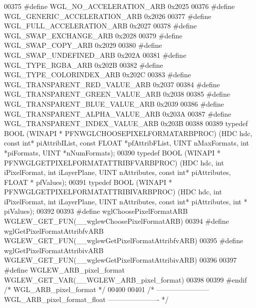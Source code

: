 \begin{DoxyCode}
00375 \textcolor{preprocessor}{#define WGL\_NO\_ACCELERATION\_ARB 0x2025}
00376 \textcolor{preprocessor}{#define WGL\_GENERIC\_ACCELERATION\_ARB 0x2026}
00377 \textcolor{preprocessor}{#define WGL\_FULL\_ACCELERATION\_ARB 0x2027}
00378 \textcolor{preprocessor}{#define WGL\_SWAP\_EXCHANGE\_ARB 0x2028}
00379 \textcolor{preprocessor}{#define WGL\_SWAP\_COPY\_ARB 0x2029}
00380 \textcolor{preprocessor}{#define WGL\_SWAP\_UNDEFINED\_ARB 0x202A}
00381 \textcolor{preprocessor}{#define WGL\_TYPE\_RGBA\_ARB 0x202B}
00382 \textcolor{preprocessor}{#define WGL\_TYPE\_COLORINDEX\_ARB 0x202C}
00383 \textcolor{preprocessor}{#define WGL\_TRANSPARENT\_RED\_VALUE\_ARB 0x2037}
00384 \textcolor{preprocessor}{#define WGL\_TRANSPARENT\_GREEN\_VALUE\_ARB 0x2038}
00385 \textcolor{preprocessor}{#define WGL\_TRANSPARENT\_BLUE\_VALUE\_ARB 0x2039}
00386 \textcolor{preprocessor}{#define WGL\_TRANSPARENT\_ALPHA\_VALUE\_ARB 0x203A}
00387 \textcolor{preprocessor}{#define WGL\_TRANSPARENT\_INDEX\_VALUE\_ARB 0x203B}
00388 
00389 \textcolor{keyword}{typedef} BOOL (WINAPI * PFNWGLCHOOSEPIXELFORMATARBPROC) (HDC hdc, \textcolor{keyword}{const} \textcolor{keywordtype}{int}* 
      piAttribIList, \textcolor{keyword}{const} FLOAT *pfAttribFList, UINT nMaxFormats, \textcolor{keywordtype}{int} *piFormats, 
      UINT *nNumFormats);
00390 \textcolor{keyword}{typedef} BOOL (WINAPI * PFNWGLGETPIXELFORMATATTRIBFVARBPROC) (HDC hdc, \textcolor{keywordtype}{int} 
      iPixelFormat, \textcolor{keywordtype}{int} iLayerPlane, UINT nAttributes, \textcolor{keyword}{const} \textcolor{keywordtype}{int}* piAttributes, FLOAT *
      pfValues);
00391 \textcolor{keyword}{typedef} BOOL (WINAPI * PFNWGLGETPIXELFORMATATTRIBIVARBPROC) (HDC hdc, \textcolor{keywordtype}{int} 
      iPixelFormat, \textcolor{keywordtype}{int} iLayerPlane, UINT nAttributes, \textcolor{keyword}{const} \textcolor{keywordtype}{int}* piAttributes, \textcolor{keywordtype}{int} *
      piValues);
00392 
00393 \textcolor{preprocessor}{#define wglChoosePixelFormatARB WGLEW\_GET\_FUN(\_\_wglewChoosePixelFormatARB)}
00394 \textcolor{preprocessor}{#define wglGetPixelFormatAttribfvARB WGLEW\_GET\_FUN(\_\_wglewGetPixelFormatAttribfvARB)}
00395 \textcolor{preprocessor}{#define wglGetPixelFormatAttribivARB WGLEW\_GET\_FUN(\_\_wglewGetPixelFormatAttribivARB)}
00396 
00397 \textcolor{preprocessor}{#define WGLEW\_ARB\_pixel\_format WGLEW\_GET\_VAR(\_\_WGLEW\_ARB\_pixel\_format)}
00398 
00399 \textcolor{preprocessor}{#endif }\textcolor{comment}{/* WGL\_ARB\_pixel\_format */}\textcolor{preprocessor}{}
00400 
00401 \textcolor{comment}{/* ----------------------- WGL\_ARB\_pixel\_format\_float ---------------------- */}

\end{DoxyCode}
